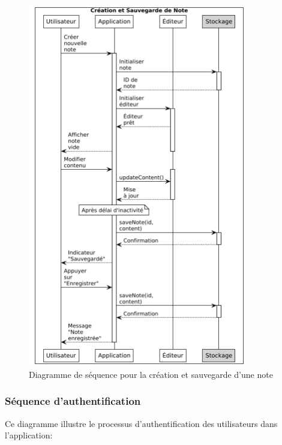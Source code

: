 \begin{figure}[H]
    \centering
    \includegraphics[width=0.85\textwidth]{assets/docs/voicenotion_sequence_save.png}
    \caption{Diagramme de séquence pour la création et sauvegarde d'une note}
    \label{fig:sequence_save_note}
\end{figure}

\subsubsection{Séquence d'authentification}

Ce diagramme illustre le processus d'authentification des utilisateurs dans l'application:

